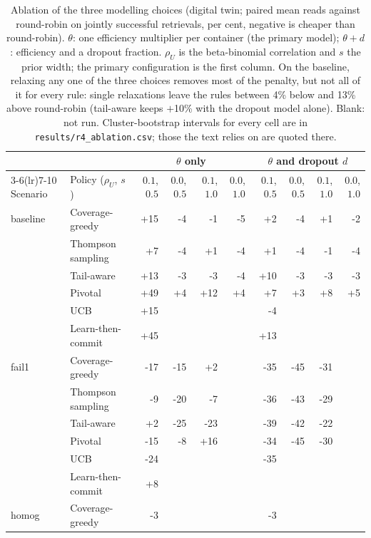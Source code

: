 \begin{table}[!t]
\centering
\caption{Ablation of the three modelling choices (digital twin; paired mean reads against round-robin on jointly successful retrievals, per cent, negative is cheaper than round-robin).  $\theta$: one efficiency multiplier per container (the primary model); $\theta{+}d$: efficiency and a dropout fraction.  $\rho_U$ is the beta-binomial correlation and $s$ the prior width; the primary configuration is the first column.  On the baseline, relaxing any one of the three choices removes most of the penalty, but not all of it for every rule: single relaxations leave the rules between 4\% below and 13\% above round-robin (tail-aware keeps $+$10\% with the dropout model alone).  Blank: not run.  Cluster-bootstrap intervals for every cell are in \texttt{results/r4\_ablation.csv}; those the text relies on are quoted there.}
\label{tab:r4abl}
\scriptsize
\setlength{\tabcolsep}{3pt}
\begin{tabular}{@{}llrrrrrrrr@{}}
\toprule
 & & \multicolumn{4}{c}{$\theta$ only} & \multicolumn{4}{c}{$\theta$ and dropout $d$} \\
\cmidrule(lr){3-6}\cmidrule(lr){7-10}
Scenario & Policy ($\rho_U$, $s$) & $0.1$, $0.5$ & $0.0$, $0.5$ & $0.1$, $1.0$ & $0.0$, $1.0$ & $0.1$, $0.5$ & $0.0$, $0.5$ & $0.1$, $1.0$ & $0.0$, $1.0$ \\
\midrule
baseline & Coverage-greedy & +15 & -4 & -1 & -5 & +2 & -4 & +1 & -2 \\
 & Thompson sampling & +7 & -4 & +1 & -4 & +1 & -4 & -1 & -4 \\
 & Tail-aware & +13 & -3 & -3 & -4 & +10 & -3 & -3 & -3 \\
 & Pivotal & +49 & +4 & +12 & +4 & +7 & +3 & +8 & +5 \\
 & UCB & +15 &  &  &  & -4 &  &  &  \\
 & Learn-then-commit & +45 &  &  &  & +13 &  &  &  \\
\midrule
fail1 & Coverage-greedy & -17 & -15 & +2 &  & -35 & -45 & -31 &  \\
 & Thompson sampling & -9 & -20 & -7 &  & -36 & -43 & -29 &  \\
 & Tail-aware & +2 & -25 & -23 &  & -39 & -42 & -22 &  \\
 & Pivotal & -15 & -8 & +16 &  & -34 & -45 & -30 &  \\
 & UCB & -24 &  &  &  & -35 &  &  &  \\
 & Learn-then-commit & +8 &  &  &  &  &  &  &  \\
\midrule
homog & Coverage-greedy & -3 &  &  &  & -3 &  &  &  \\

\end{tabular}
\end{table}
